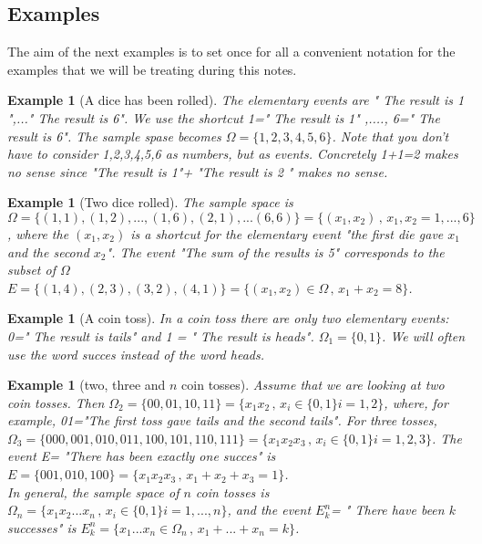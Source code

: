 \documentclass[12pt]{article}
\newtheorem{example}[theorem]{Example}
\newcommand{\<}{{\langle \!\! \langle}}
\renewcommand{\>}{{\rangle \!\! \rangle}}
\begin{document}
\subsection{Examples}

The aim of the next examples is to set once for all a convenient notation for the examples that we will be treating during this notes.

\begin{example}[A dice has been rolled]
The elementary events are " The result is 1 ",..." The result is 6". We use the shortcut 1=" The result is 1" ,...., 6=" The result is 6". The sample spase becomes $\Omega=\{1,2,3,4,5,6\}$. Note that you don't have to consider  1,2,3,4,5,6 as numbers, but as events. Concretely 1+1=2 makes no sense since "The result is 1"+ "The result is 2 " makes no sense.
\end{example}

\begin{example}[Two dice rolled]
	The sample space is $\Omega=\{(1,1),(1,2),...,(1,6),(2,1),...(6,6) \} = \{(x_1,x_2)\,,\, x_1,x_2=1,...,6\}$, where the $(x_1,x_2)$ is a shortcut for the elementary event "the first die gave $x_1$ and the second $x_2$". The event "The sum of the results is 5" corresponds to the subset of $\Omega$ $E=\{(1,4),(2,3),(3,2),(4,1)\}=\{(x_1,x_2)\in \Omega \,,\,x_1+x_2=8\}$.   
\end{example}

\begin{example}[A coin toss]
In a coin toss there are only two elementary events: 0=" The result is tails" and 1 = " The result is heads". $\Omega_1=\{0,1\}$. We will often use the word succes instead of the word heads.   
\end{example}

\begin{example}[two, three and $n$ coin tosses]
Assume that we are looking at two coin tosses. Then $\Omega_2=\{00,01,10,11\}= \{x_1x_2\,,\, x_i\in\{0,1\} i=1,2\}$, where, for example,  01="The first toss gave tails and the second tails". For three tosses, $\Omega_3=\{000,001,010,011,100,101,110,111\}=\{x_1x_2x_3\,,\,x_i\in\{0,1\} i=1,2,3\}$. The event E= "There has been exactly one succes" is $E=\{001,010,100\}=\{x_1x_2x_3\,,\,x_1+x_2+x_3=1\}$. \\
In general, the sample space of $n$ coin tosses is $\Omega_n=\{x_1x_2...x_n\,,\,x_i\in\{0,1\} i=1,...,n\}$, and the event $E^n_k$= " There have been $k$ successes" is $ E^n_k=\{x_1...x_n\in \Omega_n\,,\,x_1+...+x_n=k\}$.     
\end{example}
\end{document}
